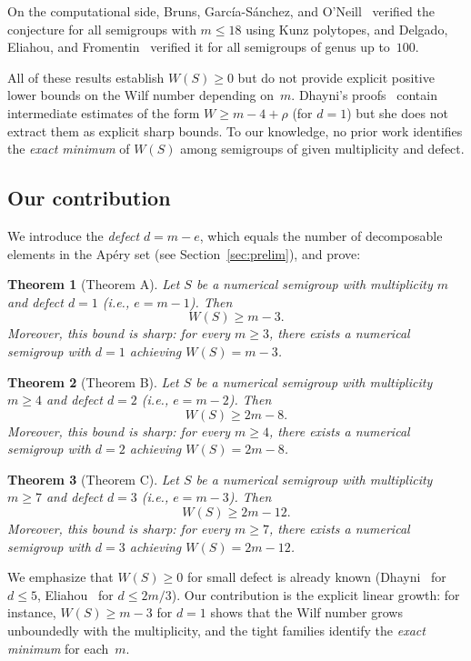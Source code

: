 \documentclass[11pt]{amsart}
\newtheorem{theorem}{Theorem}[section]
\theoremstyle{definition}
\theoremstyle{remark}
\begin{document}
On the computational side,
Bruns, Garc\'ia-S\'anchez, and O'Neill~\cite{Bruns2020} verified
the conjecture for all semigroups with $m \le 18$ using Kunz polytopes,
and Delgado, Eliahou, and Fromentin~\cite{DEF2023} verified it
for all semigroups of genus up to~$100$.

All of these results establish $W(S) \ge 0$ but do not provide explicit
positive lower bounds on the Wilf number depending on~$m$.
Dhayni's proofs~\cite{Dhayni2018} contain intermediate estimates
of the form $W \ge m - 4 + \rho$ (for $d = 1$) but she does not
extract them as explicit sharp bounds.
To our knowledge, no prior work identifies the \emph{exact minimum}
of $W(S)$ among semigroups of given multiplicity and defect.

\subsection{Our contribution}

We introduce the \emph{defect} $d = m - e$, which equals the number of
decomposable elements in the Ap\'ery set (see Section~\ref{sec:prelim}),
and prove:

\begin{theorem}[Theorem A]\label{thm:A-intro}
Let $S$ be a numerical semigroup with multiplicity $m$ and defect $d = 1$
(i.e., $e = m - 1$).  Then
\[
  W(S) \ge m - 3.
\]
Moreover, this bound is sharp: for every $m \ge 3$, there exists a
numerical semigroup with $d = 1$ achieving $W(S) = m - 3$.
\end{theorem}

\begin{theorem}[Theorem B]\label{thm:B-intro}
Let $S$ be a numerical semigroup with multiplicity $m \ge 4$ and defect $d = 2$
(i.e., $e = m - 2$).  Then
\[
  W(S) \ge 2m - 8.
\]
Moreover, this bound is sharp: for every $m \ge 4$, there exists a
numerical semigroup with $d = 2$ achieving $W(S) = 2m - 8$.
\end{theorem}

\begin{theorem}[Theorem C]\label{thm:C-intro}
Let $S$ be a numerical semigroup with multiplicity $m \ge 7$ and defect $d = 3$
(i.e., $e = m - 3$).  Then
\[
  W(S) \ge 2m - 12.
\]
Moreover, this bound is sharp: for every $m \ge 7$, there exists a
numerical semigroup with $d = 3$ achieving $W(S) = 2m - 12$.
\end{theorem}

We emphasize that $W(S) \ge 0$ for small defect is already known
(Dhayni~\cite{Dhayni2018} for $d \le 5$, Eliahou~\cite{Eliahou2018}
for $d \le 2m/3$).
Our contribution is the explicit linear growth: for instance,
$W(S) \ge m - 3$ for $d = 1$ shows that the Wilf number grows
unboundedly with the multiplicity, and the tight families identify
the \emph{exact minimum} for each~$m$.
\end{document}
